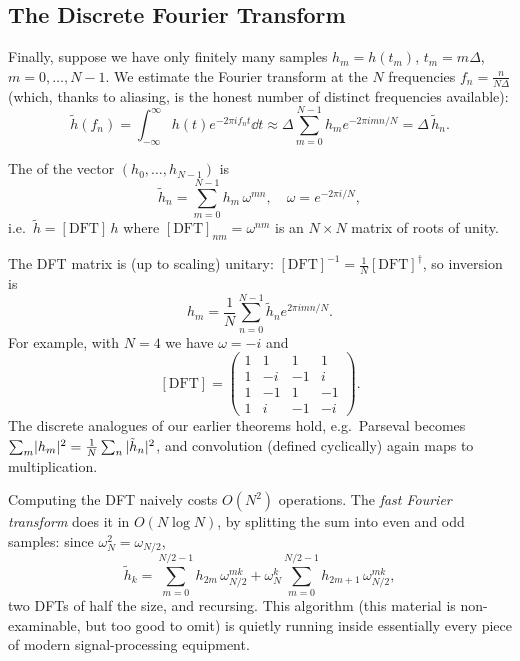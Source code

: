 \documentclass[a4paper]{scrartcl}
\begin{document}
\subsection{The Discrete Fourier Transform}

Finally, suppose we have only finitely many samples $h_m = h(t_m)$, $t_m = m \Delta$, $m = 0, \dots, N - 1$. We estimate the Fourier transform at the $N$ frequencies $f_n = \frac{n}{N \Delta}$ (which, thanks to aliasing, is the honest number of distinct frequencies available):
$$
\tilde{h}(f_n) = \int_{-\infty}^{\infty} h(t) e^{-2 \pi i f_n t} \dd t \approx \Delta \sum_{m = 0}^{N - 1} h_m e^{-2 \pi i m n /N} = \Delta \,\tilde{h}_n.
$$

\begin{definition}
    The  of the vector $(h_0, \dots, h_{N-1})$ is
    $$
    \tilde{h}_n = \sum_{m = 0}^{N - 1} h_m \, \omega^{mn}, \quad \omega = e^{-2\pi i /N},
    $$
    i.e.\ $\tilde{h} = [\mathrm{DFT}]\, h$ where $[\mathrm{DFT}]_{nm} = \omega^{nm}$ is an $N \times N$ matrix of roots of unity.
\end{definition}

The DFT matrix is (up to scaling) unitary: $[\mathrm{DFT}]^{-1} = \frac{1}{N}[\mathrm{DFT}]^{\dagger}$, so inversion is
$$
h_m = \frac{1}{N} \sum_{n = 0}^{N - 1} \tilde{h}_n e^{2 \pi i mn/N}.
$$
For example, with $N = 4$ we have $\omega = -i$ and
$$
[\mathrm{DFT}] = \begin{pmatrix}
    1 & 1 & 1 & 1 \\
    1 & -i & -1 & i \\
    1 & -1 & 1 & -1 \\
    1 & i & -1 & -i
\end{pmatrix}.
$$
The discrete analogues of our earlier theorems hold, e.g.\ Parseval becomes $\sum_m \lvert h_m\rvert^2 = \frac{1}{N}\sum_n |\tilde{h}_n|^2$, and convolution (defined cyclically) again maps to multiplication.

\begin{remark}
    Computing the DFT naively costs $O(N^2)$ operations. The \emph{fast Fourier transform} does it in $O(N \log N)$, by splitting the sum into even and odd samples: since $\omega_N^2 = \omega_{N/2}$,
    $$
    \tilde{h}_k = \sum_{m = 0}^{N/2 - 1} h_{2m}\, \omega_{N/2}^{mk} + \omega_N^{k}\sum_{m = 0}^{N/2 - 1} h_{2m + 1}\, \omega_{N/2}^{mk},
    $$
    two DFTs of half the size, and recursing. This algorithm (this material is non-examinable, but too good to omit) is quietly running inside essentially every piece of modern signal-processing equipment.
\end{remark}
\end{document}
